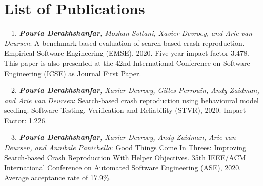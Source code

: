 \chapter*{List of Publications}
\label{publications}



\begin{etaremune}{\small
    \item[\faFileTextO~~1.] \emph{\textbf{Pouria Derakhshanfar}, Mozhan Soltani, Xavier Devroey, and Arie van Deursen}: 
    A benchmark-based evaluation of search-based crash reproduction.
    Empirical Software Engineering (EMSE),
    2020. Five-year impact factor 3.478. This paper is also presented at the 42nd International Conference on Software Engineering (ICSE) as Journal First Paper.
}\end{etaremune}

\begin{etaremune}{\small
    \item[\faFileTextO~~2.] \emph{\textbf{Pouria Derakhshanfar}, Xavier Devroey, Gilles Perrouin,  Andy Zaidman, and Arie van Deursen}: 
        Search‐based crash reproduction using behavioural model seeding.
        Software Testing, Verification and Reliability (STVR),
        2020. Impact Factor: 1.226.
}\end{etaremune}

\begin{etaremune}{\small
    \item[\faFileTextO~~3.] \emph{\textbf{Pouria Derakhshanfar}, Xavier Devroey,  Andy Zaidman, Arie van Deursen, and Annibale Panichella}: 
        Good Things Come In Threes: Improving Search-based Crash Reproduction With Helper Objectives.
        35th IEEE/ACM International Conference on Automated Software Engineering (ASE),
        2020. Average acceptance rate of 17.9\%.
}\end{etaremune}


